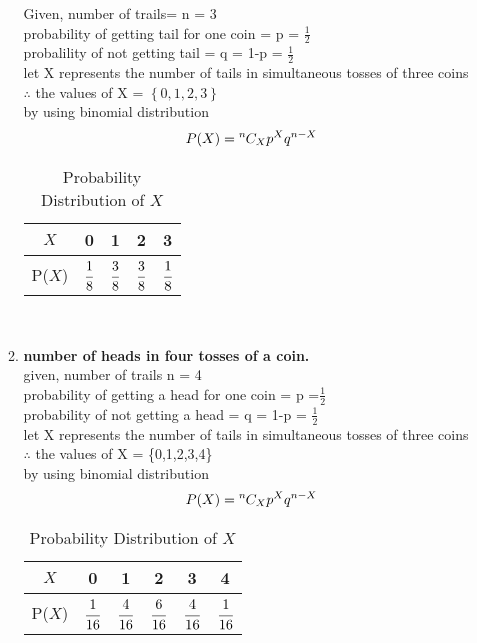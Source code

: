 \documentclass{article}
\providecommand{\cbrak}[1]{\ensuremath{\left\{#1\right\}}}
\newcommand*{\permcomb}[4][0mu]{{{}^{#3}\mkern#1#2_{#4}}}
\newcommand*{\comb}[1][-1mu]{\permcomb[#1]{C}}
\newcommand\T{\rule{0pt}{2.6ex}}       %
\begin{document}
\begin{enumerate}[label=13.\arabic{enumi}.\arabic{enumii}]
\begin{enumerate}
Given, number of trails= n = 3\\
probability of getting tail for one coin = p = $\frac{1}{2}$\\
probalility of not getting tail =  q = 1-p = $\frac{1}{2}$\\
let X represents the number of tails in simultaneous tosses of three coins
 $\therefore$ the values of X = \cbrak{0,1,2,3}\\
 by using binomial distribution\\
 \begin{align}
 P(X) = \comb{n}{X}p^Xq^{n-X}
 \end{align}
	\begin{table}[ht]
	\normalsize
	\centering
			\begin{tabular}[20pt]{|c|c|c|c|c|} \hline		%
			$X$&0&1&2&3 \T \\ \hline
			P($X$)&$\cfrac{1}{8}$&$\cfrac{3}{8}$&$\cfrac{3}{8}$&$\cfrac{1}{8}$\\[1.5ex] \hline
		\end{tabular}\\[2ex]
		\caption{Probability Distribution of $X$}
	\end{table}
\item \textbf{number of heads in four tosses of a coin.\\}
given, number of trails n = 4\\
probability of getting a head for one coin = p =$\frac{1}{2}$\\
probability of not getting a head = q = 1-p = $\frac{1}{2}$\\
let X represents the number of tails in simultaneous tosses of three coins\\
 $\therefore$ the values of X = \{0,1,2,3,4\}\\
 by using binomial distribution\\
 \begin{align}
 P(X) = \comb{n}{X}p^Xq^{n-X}
 \end{align}

	\begin{table}[h]
	\normalsize
	\centering
			\begin{tabular}[20pt]{|c|c|c|c|c|c|} \hline		%
			$X$&0&1&2&3&4 \T \\ \hline
			P($X$)&$\cfrac{1}{16}$&$\cfrac{4}{16}$&$\cfrac{6}{16}$&$\cfrac{4}{16}$&$\cfrac{1}{16}$\\[1.5ex] \hline
		\end{tabular}\\[2ex]
		\caption{Probability Distribution of $X$}
	\end{table}
\end{enumerate}
\end{enumerate}
\end{document}
